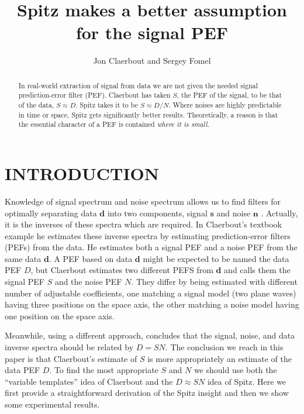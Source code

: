 


\title{Spitz makes a better assumption for the signal
  PEF}

\author{Jon Claerbout and Sergey Fomel}
\def\eq{\quad =\quad}
\maketitle

\begin{abstract}
In real-world extraction of signal from data we are not given the
needed signal prediction-error filter (PEF).  Claerbout has taken $S$,
the PEF of the signal, to be that of the data, $S\approx D$.  Spitz
takes it to be $S\approx D/N$.  Where noises are highly predictable in
time or space, Spitz gets significantly better results.
Theoretically, a reason is that the essential character of a PEF is
contained {\it where it is small.}
\end{abstract}


\section{INTRODUCTION}

Knowledge of signal spectrum and noise spectrum
allows us to find filters for optimally
separating data $\mathbf d$ into two components, signal $\mathbf s$
and noise $\mathbf n$ \cite[]{gee}.
Actually, it is the inverses of these spectra
which are required.
In Claerbout's textbook example \cite[]{gee}
he estimates these inverse spectra by estimating prediction-error filters
(PEFs) from the data.
He estimates both a signal PEF and a noise PEF from the same data $\mathbf d$.
A PEF based on data $\mathbf d$ might be expected to be named the data PEF $D$,
but Claerbout estimates two different PEFS from $\mathbf d$
and calls them the signal PEF $S$ and the noise PEF $N$.
They differ by being estimated with different number
of adjustable coefficients, one matching a signal model
(two plane waves) having three positions on the space axis,
the other matching a noise model
having one position on the space axis.
\par
Meanwhile, using a different approach,
\cite{TLE18-01-00550058} concludes
that the signal, noise, and data inverse spectra
should be related by $D=SN$.
The conclusion we reach in this paper
is that Claerbout's estimate of $S$ is more
appropriately an estimate of the data PEF $D$.
To find the most appropriate $S$ and $N$ we
should use both the ``variable templates'' idea of Claerbout
and the $D\approx SN$ idea of Spitz.
Here we first
provide a straightforward derivation of the Spitz insight
and then we show some experimental results.

